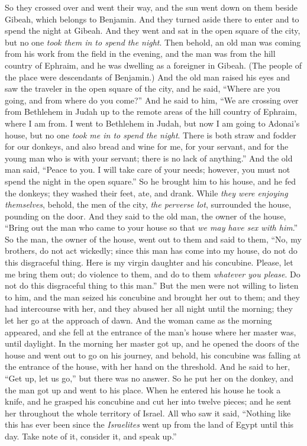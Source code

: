 \begin{biblechapter}
\verse So they crossed over and went their way, and the sun went down on them beside Gibeah, which belongs to Benjamin.
\verse And they turned aside there to enter and to spend the night at Gibeah. And they went and sat in the open square of the city, but no one \textit{took them in to spend the night}.
\verse Then behold, an old man was coming from his work from the field in the evening, and the man was from the hill country of Ephraim, and he was dwelling as a foreigner in Gibeah. (The people of the place were descendants of Benjamin.)
\verse And the old man raised his eyes and saw the traveler in the open square of the city, and he said, “Where are you going, and from where do you come?”
\verse And he said to him, “We are crossing over from Bethlehem in Judah up to the remote areas of the hill country of Ephraim, where I am from. I went to Bethlehem in Judah, but now I am going to Adonai’s house, but no one \textit{took me in to spend the night}.
\verse There is both straw and fodder for our donkeys, and also bread and wine for me, for your servant, and for the young man who is with your servant; there is no lack of anything.”
\verse And the old man said, “Peace to you. I will take care of your needs; however, you must not spend the night in the open square.”
\verse So he brought him to his house, and he fed the donkeys; they washed their feet, ate, and drank.
\verse While \textit{they were enjoying themselves}, behold, the men of the city, \textit{the perverse lot}, surrounded the house, pounding on the door. And they said to the old man, the owner of the house, “Bring out the man who came to your house so that \textit{we may have sex with him}.”
\verse So the man, the owner of the house, went out to them and said to them, “No, my brothers, do not act wickedly; since this man has come into my house, do not do this disgraceful thing.
\verse Here is my virgin daughter and his concubine. Please, let me bring them out; do violence to them, and do to them \textit{whatever you please}. Do not do this disgraceful thing to this man.”
\verse But the men were not willing to listen to him, and the man seized his concubine and brought her out to them; and they had intercourse with her, and they abused her all night until the morning; they let her go at the approach of dawn.
\verse And the woman came as the morning appeared, and she fell at the entrance of the man’s house where her master was, until daylight.
\verse In the morning her master got up, and he opened the doors of the house and went out to go on his journey, and behold, his concubine was falling at the entrance of the house, with her hand on the threshold.
\verse And he said to her, “Get up, let us go,” but there was no answer. So he put her on the donkey, and the man got up and went to his place.
\verse When he entered his house he took a knife, and he grasped his concubine and cut her into twelve pieces; and he sent her throughout the whole territory of Israel.
\verse All who saw it said, “Nothing like this has ever been since the \textit{Israelites} went up from the land of Egypt until this day. Take note of it, consider it, and speak up.”
\end{biblechapter}

